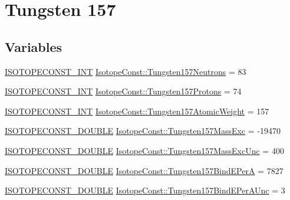 \hypertarget{group___isotope_const-_tungsten-_w157}{}\section{Tungsten 157}
\label{group___isotope_const-_tungsten-_w157}
\subsection*{Variables}
\begin{DoxyCompactItemize}
\item 
\mbox{\hyperlink{group___isotope_const-_macros_ga5f18360b3e99483a35c32d789e62621c}{I\+S\+O\+T\+O\+P\+E\+C\+O\+N\+S\+T\+\_\+\+I\+NT}} \mbox{\hyperlink{group___isotope_const-_tungsten-_w157_ga9df74d494213bf34a7e1c2f7a04705dc}{Isotope\+Const\+::\+Tungsten157\+Neutrons}} = 83
\item 
\mbox{\hyperlink{group___isotope_const-_macros_ga5f18360b3e99483a35c32d789e62621c}{I\+S\+O\+T\+O\+P\+E\+C\+O\+N\+S\+T\+\_\+\+I\+NT}} \mbox{\hyperlink{group___isotope_const-_tungsten-_w157_ga99da768838b8672fa4d883843a543d3a}{Isotope\+Const\+::\+Tungsten157\+Protons}} = 74
\item 
\mbox{\hyperlink{group___isotope_const-_macros_ga5f18360b3e99483a35c32d789e62621c}{I\+S\+O\+T\+O\+P\+E\+C\+O\+N\+S\+T\+\_\+\+I\+NT}} \mbox{\hyperlink{group___isotope_const-_tungsten-_w157_gafbbce65535d81cdf80dcfe4a5425c83f}{Isotope\+Const\+::\+Tungsten157\+Atomic\+Weight}} = 157
\item 
\mbox{\hyperlink{group___isotope_const-_macros_ga8f45a7272ce02c0b4c65c44636ed719a}{I\+S\+O\+T\+O\+P\+E\+C\+O\+N\+S\+T\+\_\+\+D\+O\+U\+B\+LE}} \mbox{\hyperlink{group___isotope_const-_tungsten-_w157_gaded8f76ee062ead71479b7cab7909d35}{Isotope\+Const\+::\+Tungsten157\+Mass\+Exc}} = -\/19470
\item 
\mbox{\hyperlink{group___isotope_const-_macros_ga8f45a7272ce02c0b4c65c44636ed719a}{I\+S\+O\+T\+O\+P\+E\+C\+O\+N\+S\+T\+\_\+\+D\+O\+U\+B\+LE}} \mbox{\hyperlink{group___isotope_const-_tungsten-_w157_gaa99b851807c0e2b4b61a903a082b0d4f}{Isotope\+Const\+::\+Tungsten157\+Mass\+Exc\+Unc}} = 400
\item 
\mbox{\hyperlink{group___isotope_const-_macros_ga8f45a7272ce02c0b4c65c44636ed719a}{I\+S\+O\+T\+O\+P\+E\+C\+O\+N\+S\+T\+\_\+\+D\+O\+U\+B\+LE}} \mbox{\hyperlink{group___isotope_const-_tungsten-_w157_gaf4699bfbc6751e6024b624d9a4b2adb1}{Isotope\+Const\+::\+Tungsten157\+Bind\+E\+PerA}} = 7827
\item 
\mbox{\hyperlink{group___isotope_const-_macros_ga8f45a7272ce02c0b4c65c44636ed719a}{I\+S\+O\+T\+O\+P\+E\+C\+O\+N\+S\+T\+\_\+\+D\+O\+U\+B\+LE}} \mbox{\hyperlink{group___isotope_const-_tungsten-_w157_gae1f177fb8ba1b62fc45a3bcf6e44ac1d}{Isotope\+Const\+::\+Tungsten157\+Bind\+E\+Per\+A\+Unc}} = 3

\end{DoxyCompactItemize}
